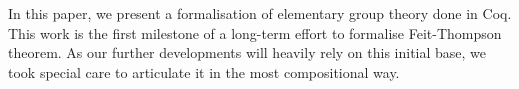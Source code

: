 In this paper, we present a formalisation of elementary group
theory done in {\sc Coq}. This work is the first milestone
of a long-term effort to formalise Feit-Thompson theorem.
As our further developments will heavily rely on this initial base,
we took special care to articulate it in the most
compositional way.

